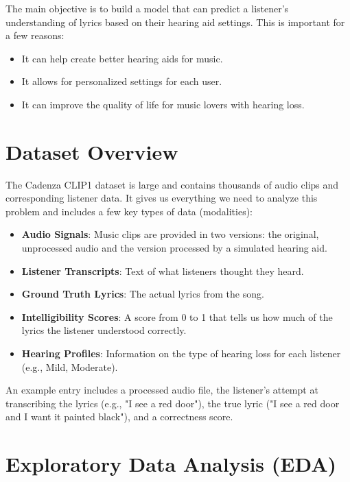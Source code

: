 \documentclass[conference]{IEEEtran}
\begin{document}
The main objective is to build a model that can predict a listener's understanding of lyrics based on their hearing aid settings. This is important for a few reasons:
\begin{itemize}
    \item It can help create better hearing aids for music.
    \item It allows for personalized settings for each user.
    \item It can improve the quality of life for music lovers with hearing loss.
\end{itemize}

\section{Dataset Overview}
The Cadenza CLIP1 dataset is large and contains thousands of audio clips and corresponding listener data. It gives us everything we need to analyze this problem and includes a few key types of data (modalities):
\begin{itemize}
    \item \textbf{Audio Signals}: Music clips are provided in two versions: the original, unprocessed audio and the version processed by a simulated hearing aid.
    \item \textbf{Listener Transcripts}: Text of what listeners thought they heard.
    \item \textbf{Ground Truth Lyrics}: The actual lyrics from the song.
    \item \textbf{Intelligibility Scores}: A score from 0 to 1 that tells us how much of the lyrics the listener understood correctly.
    \item \textbf{Hearing Profiles}: Information on the type of hearing loss for each listener (e.g., Mild, Moderate).
\end{itemize}
An example entry includes a processed audio file, the listener's attempt at transcribing the lyrics (e.g., "I see a red door"), the true lyric ("I see a red door and I want it painted black"), and a correctness score.

\section{Exploratory Data Analysis (EDA)}
\end{document}

